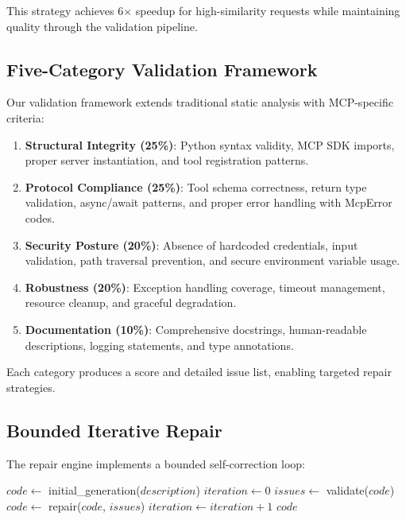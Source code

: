 \documentclass[10pt,twocolumn]{article}
\begin{document}
This strategy achieves 6× speedup for high-similarity requests while maintaining quality through the validation pipeline.

\subsection{Five-Category Validation Framework}

Our validation framework extends traditional static analysis with MCP-specific criteria:

\begin{enumerate}
\item \textbf{Structural Integrity (25\%)}: Python syntax validity, MCP SDK imports, proper server instantiation, and tool registration patterns.

\item \textbf{Protocol Compliance (25\%)}: Tool schema correctness, return type validation, async/await patterns, and proper error handling with McpError codes.

\item \textbf{Security Posture (20\%)}: Absence of hardcoded credentials, input validation, path traversal prevention, and secure environment variable usage.

\item \textbf{Robustness (20\%)}: Exception handling coverage, timeout management, resource cleanup, and graceful degradation.

\item \textbf{Documentation (10\%)}: Comprehensive docstrings, human-readable descriptions, logging statements, and type annotations.
\end{enumerate}

Each category produces a score and detailed issue list, enabling targeted repair strategies.

\subsection{Bounded Iterative Repair}

The repair engine implements a bounded self-correction loop:

\begin{algorithm}[h]
\caption{Bounded Iterative Repair}
\begin{algorithmic}[1]
\STATE $code \leftarrow$ initial\_generation($description$)
\STATE $iteration \leftarrow 0$
    \STATE $issues \leftarrow$ validate($code$)
    \STATE $code \leftarrow$ repair($code$, $issues$)
    \STATE $iteration \leftarrow iteration + 1$
\ENDWHILE
\RETURN $code$
\end{algorithmic}
\end{algorithm}
\end{document}
